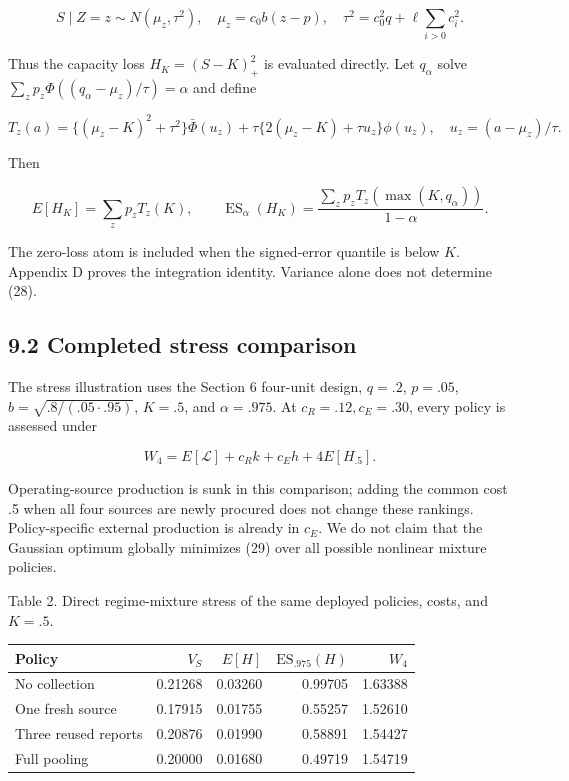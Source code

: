 \documentclass[
  11pt,
]{article}
\begin{document}
\[S\mid Z=z\sim N(\mu_z,\tau^2),\quad
\mu_z=c_0b(z-p),\quad
\tau^2=c_0^2q+\ell\sum_{i>0}c_i^2. \tag{27}\]

Thus the capacity loss \(H_K=(S-K)_+^2\) is evaluated directly. Let
\(q_\alpha\) solve \(\sum_zp_z\Phi((q_\alpha-\mu_z)/\tau)=\alpha\) and
define

\[T_z(a)=\{(\mu_z-K)^2+\tau^2\}\bar\Phi(u_z)
+\tau\{2(\mu_z-K)+\tau u_z\}\phi(u_z),\quad u_z=(a-\mu_z)/\tau.\]

Then

\[E[H_K]=\sum_zp_zT_z(K),\qquad
\operatorname{ES}_\alpha(H_K)=\frac{\sum_zp_zT_z(\max(K,q_\alpha))}{1-\alpha}. \tag{28}\]

The zero-loss atom is included when the signed-error quantile is below
\(K\). Appendix D proves the integration identity. Variance alone does
not determine (28).

\subsection{9.2 Completed stress
comparison}\label{completed-stress-comparison}

The stress illustration uses the Section 6 four-unit design, \(q=.2\),
\(p=.05\), \(b=\sqrt{.8/(.05\cdot.95)}\), \(K=.5\), and \(\alpha=.975\).
At \(c_R=.12,c_E=.30\), every policy is assessed under

\[W_4=E[\mathcal L]+c_Rk+c_Eh+4E[H_{.5}]. \tag{29}\]

Operating-source production is sunk in this comparison; adding the
common cost .5 when all four sources are newly procured does not change
these rankings. Policy-specific external production is already in
\(c_E\). We do not claim that the Gaussian optimum globally minimizes
(29) over all possible nonlinear mixture policies.

Table 2. Direct regime-mixture stress of the same deployed policies,
costs, and \(K=.5\).

\begin{center}
\small
\begin{tabular}{lrrrr}
\toprule
Policy & $V_S$ & $E[H]$ & $\mathrm{ES}_{.975}(H)$ & $W_4$ \\
\midrule
No collection & 0.21268 & 0.03260 & 0.99705 & 1.63388 \\
One fresh source & 0.17915 & 0.01755 & 0.55257 & 1.52610 \\
Three reused reports & 0.20876 & 0.01990 & 0.58891 & 1.54427 \\
Full pooling & 0.20000 & 0.01680 & 0.49719 & 1.54719 \\
\bottomrule
\end{tabular}
\end{center}
\end{document}
